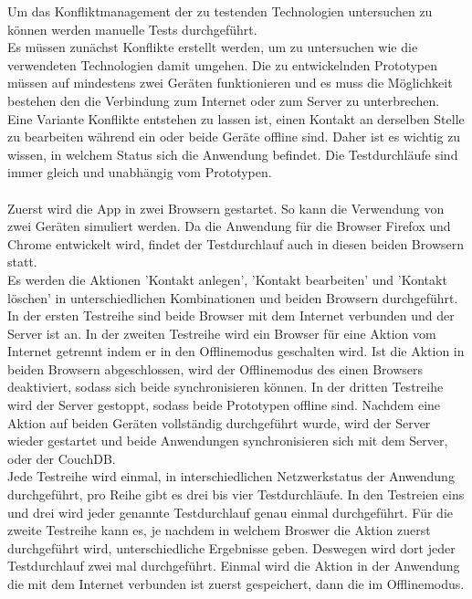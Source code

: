 Um das Konfliktmanagement der zu testenden Technologien untersuchen zu können werden manuelle Tests durchgeführt.\\
Es müssen zunächst Konflikte erstellt werden, um zu untersuchen wie die verwendeten Technologien damit umgehen. Die zu entwickelnden Prototypen müssen auf mindestens zwei Geräten funktionieren und es muss die Möglichkeit bestehen den die Verbindung zum Internet oder zum Server zu unterbrechen.
Eine Variante Konflikte entstehen zu lassen ist, einen Kontakt an derselben Stelle zu bearbeiten während ein oder beide Geräte offline sind. Daher ist es wichtig zu wissen, in welchem Status sich die Anwendung befindet.
Die Testdurchläufe sind immer gleich und unabhängig vom Prototypen.\\\\
Zuerst wird die \gls{App} in zwei Browsern gestartet. So kann die Verwendung von zwei Geräten simuliert werden. Da die Anwendung für die Browser Firefox und Chrome entwickelt wird, findet der Testdurchlauf auch in diesen beiden Browsern statt.\\
Es werden die Aktionen 'Kontakt anlegen', 'Kontakt bearbeiten' und 'Kontakt löschen' in unterschiedlichen Kombinationen und beiden Browsern durchgeführt.
In der ersten Testreihe sind beide Browser mit dem Internet verbunden und der Server ist an.
In der zweiten Testreihe wird ein Browser für eine Aktion vom Internet getrennt indem er in den Offlinemodus geschalten wird. Ist die Aktion in beiden Browsern abgeschlossen, wird der Offlinemodus des einen Browsers deaktiviert, sodass sich beide synchronisieren können.
In der dritten Testreihe wird der Server gestoppt, sodass beide Prototypen offline sind. Nachdem eine Aktion auf beiden Geräten vollständig durchgeführt wurde, wird der Server wieder gestartet und beide Anwendungen synchronisieren sich mit dem Server, oder der CouchDB.\\
Jede Testreihe wird einmal, in interschiedlichen Netzwerkstatus der Anwendung durchgeführt, pro Reihe gibt es drei bis vier Testdurchläufe.
In den Testreien eins und drei wird jeder genannte Testdurchlauf genau einmal durchgeführt.
Für die zweite Testreihe kann es, je nachdem in welchem Broswer die Aktion zuerst durchgeführt wird, unterschiedliche Ergebnisse geben.
Deswegen wird dort jeder Testdurchlauf zwei mal durchgeführt.
Einmal wird die Aktion in der Anwendung die mit dem Internet verbunden ist zuerst gespeichert, dann die im Offlinemodus.\\
